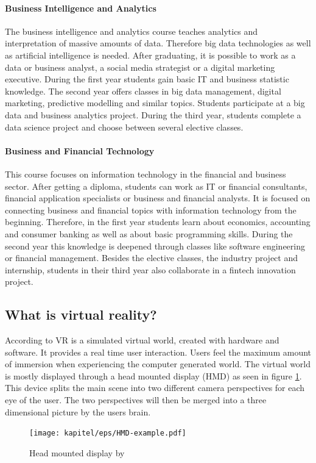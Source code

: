 \paragraph{Business Intelligence and Analytics}
The business intelligence and analytics course teaches analytics and interpretation of massive amounts of data. Therefore big data technologies as well as artificial intelligence is needed. After graduating, it is possible to work as a data or business analyst, a social media strategist or a digital marketing executive. During the first year students gain basic IT and business statistic knowledge. The second year offers classes in big data management, digital marketing, predictive modelling and similar topics. Students participate at a big data and business analytics project.
During the third year, students complete a data science project and choose between several elective classes.

\paragraph{Business and Financial Technology}
This course focuses on information technology in the financial and business sector. After getting a diploma, students can work as IT or financial consultants, financial application specialists or business and financial analysts. It is focused on connecting business and financial topics with information technology from the beginning. Therefore, in the first year students learn about economics, accounting and consumer banking as well as about basic programming skills. During the second year this knowledge is deepened through classes like software engineering or financial management. Besides the elective classes, the industry project and internship, students in their third year also collaborate in a fintech innovation project.

\subsection{What is virtual reality?}
According to \cite{Fuchs.2011} VR is a simulated virtual world, created with hardware and software. It provides a real time user interaction. Users feel the maximum amount of immersion when experiencing the computer generated world. The virtual world is mostly displayed through a head mounted display (HMD) as seen in figure \ref{fig:hmd}. This device splits the main scene into two different camera perspectives for each eye of the user. The two perspectives will then be merged into a three dimensional picture by the users brain. \\
\begin{figure}[h!]
  \texttt{[image: kapitel/eps/HMD-example.pdf]}
  \centering
  \caption{Head mounted display by \cite{hmd1}}
  \label{fig:hmd}
\end{figure}

